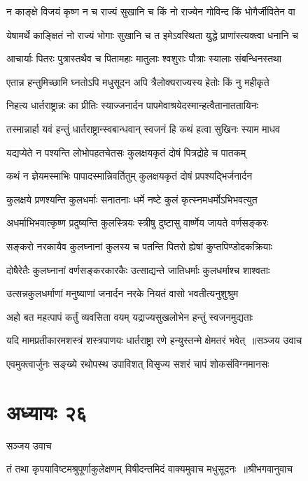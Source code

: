 \twolineshloka
{न काङ्क्षे विजयं कृष्ण न च राज्यं सुखानि च}
{किं नो राज्येन गोविन्द किं भोगैर्जीवितेन वा}


\twolineshloka
{येषामर्थे काङ्क्षितं नो राज्यं भोगाः सुखानि च}
{त इमेऽवस्थिता युद्धे प्राणांस्त्यक्त्वा धनानि च}


\twolineshloka
{आचार्याः पितरः पुत्रास्तथैव च पितामहाः}
{मातुलाः श्वशुराः पौत्राः स्यालाः संबन्धिनस्तथा}


\twolineshloka
{एतान्न हन्तुमिच्छामि घ्नतोऽपि मधुसूदन}
{अपि त्रैलोक्यराज्यस्य हेतोः किं नु महीकृते}


\twolineshloka
{निहत्य धार्तराष्ट्रान्नः का प्रीतिः स्याज्जनार्दन}
{पापमेवाश्रयेदस्मान्हत्वैतानाततायिनः}


\twolineshloka
{तस्मान्नार्हा यवं हन्तुं धार्तराष्ट्रान्स्वबान्धवान्}
{स्वजनं हि कथं हत्वा सुखिनः स्याम माधव}


\twolineshloka
{यद्यप्येते न पश्यन्ति लोभोपहतचेतसः}
{कुलक्षयकृतं दोषं पित्रद्रोहे च पातकम्}


\twolineshloka
{कथं न ज्ञेयमस्माभिः पापादस्मान्निवर्तितुम्}
{कुलक्षयकृतं दोषं प्रपश्यद्भिर्जनार्दन}


\twolineshloka
{कुलक्षये प्रणश्यन्ति कुलधर्माः सनातनाः}
{धर्मे नष्टे कुलं कृत्स्नमधर्मोऽभिभवत्युत}


\twolineshloka
{अधर्माभिभवात्कृष्ण प्रदुष्यन्ति कुलस्त्रियः}
{स्त्रीषु दुष्टासु वार्ष्णेय जायते वर्णसङ्करः}


\twolineshloka
{सङ्करो नरकायैव कुलघ्नानां कुलस्य च}
{पतन्ति पितरो ह्येषां कुप्तपिण्डोदकक्रियाः}


\twolineshloka
{दोषैरेतैः कुलघ्नानां वर्णसङ्करकारकैः}
{उत्साद्यन्ते जातिधर्माः कुलधर्माश्च शाश्वताः}


\twolineshloka
{उत्सन्नकुलधर्माणां मनुष्याणां जनार्दन}
{नरके नियतं वासो भवतीत्यनुशुश्रुम}


\twolineshloka
{अहो बत महत्पापं कर्तुं व्यवसिता वयम्}
{यद्राज्यसुखलोभेन हन्तुं स्वजनमुद्यताः}


\threelineshloka
{यदि मामप्रतीकारमशस्त्रं शस्त्रपाणयः}
{धार्तराष्ट्रा रणे हन्युस्तन्मे क्षेमतरं भवेत् ॥सञ्जय उवाच}
{}


\twolineshloka
{एवमुक्त्वार्जुनः सङ्ख्ये रथोपस्थ उपाविशत्}
{विसृज्य सशरं चापं शोकसंविग्नमानसः}


\chapter{अध्यायः २६}
\twolineshloka
{सञ्जय उवाच}
{}


\threelineshloka
{तं तथा कृपयाविष्टमश्रुपूर्णाकुलेक्षणम्}
{विषीदन्तमिदं वाक्यमुवाच मधुसूदनः ॥श्रीभगवानुवाच}
{}


